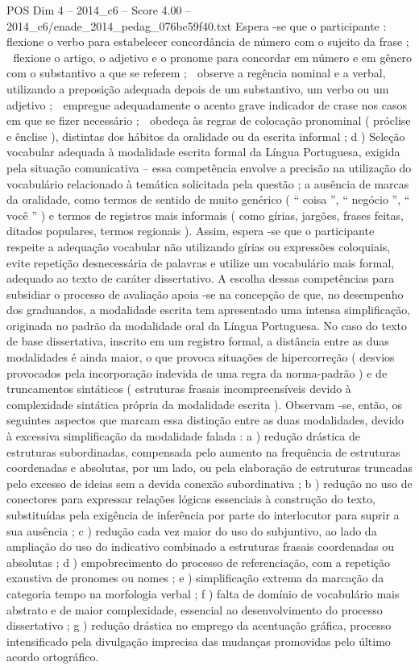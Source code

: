 \begin{textsample}{POS Dim 4 – 2014\_c6 – Score 4.00 – 2014\_c6/enade\_2014\_pedag\_076bc59f40.txt}
Espera -se que o participante :  flexione o verbo para estabelecer concordância de número com o sujeito da frase ;  flexione o artigo, o adjetivo e o pronome para concordar em número e em gênero com o substantivo a que se referem ;  observe a regência nominal e a verbal, utilizando a preposição adequada depois de um substantivo, um verbo ou um adjetivo ;  empregue adequadamente o acento grave indicador de crase nos casos em que se fizer necessário ;  obedeça às regras de colocação pronominal ( próclise e ênclise ), distintas dos hábitos da oralidade ou da escrita informal ; d ) Seleção vocabular adequada à modalidade escrita formal da Língua Portuguesa, exigida pela situação comunicativa – essa competência envolve a precisão na utilização do vocabulário relacionado à temática solicitada pela questão ; a ausência de marcas da oralidade, como termos de sentido de muito genérico ( “ coisa ”, “ negócio ”, “ você ” ) e termos de registros mais informais ( como gírias, jargões, frases feitas, ditados populares, termos regionais ).
Assim, espera -se que o participante respeite a adequação vocabular não utilizando gírias ou expressões coloquiais, evite repetição desnecessária de palavras e utilize um vocabulário mais formal, adequado ao texto de caráter dissertativo.
A escolha dessas competências para subsidiar o processo de avaliação apoia -se na concepção de que, no desempenho dos graduandos, a modalidade escrita tem apresentado uma intensa simplificação, originada no padrão da modalidade oral da Língua Portuguesa.
No caso do texto de base dissertativa, inscrito em um registro formal, a distância entre as duas modalidades é ainda maior, o que provoca situações de hipercorreção ( desvios provocados pela incorporação indevida de uma regra da norma-padrão ) e de truncamentos sintáticos ( estruturas frasais incompreensíveis devido à complexidade sintática própria da modalidade escrita ).
Observam -se, então, os seguintes aspectos que marcam essa distinção entre as duas modalidades, devido à excessiva simplificação da modalidade falada : a ) redução drástica de estruturas subordinadas, compensada pelo aumento na frequência de estruturas coordenadas e absolutas, por um lado, ou pela elaboração de estruturas truncadas pelo excesso de ideias sem a devida conexão subordinativa ; b ) redução no uso de conectores para expressar relações lógicas essenciais à construção do texto, substituídas pela exigência de inferência por parte do interlocutor para suprir a sua ausência ; c ) redução cada vez maior do uso do subjuntivo, ao lado da ampliação do uso do indicativo combinado a estruturas frasais coordenadas ou absolutas ; d ) empobrecimento do processo de referenciação, com a repetição exaustiva de pronomes ou nomes ; e ) simplificação extrema da marcação da categoria tempo na morfologia verbal ; f ) falta de domínio de vocabulário mais abstrato e de maior complexidade, essencial ao desenvolvimento do processo dissertativo ; g ) redução drástica no emprego da acentuação gráfica, processo intensificado pela divulgação imprecisa das mudanças promovidas pelo último acordo ortográfico.

\end{textsample}
